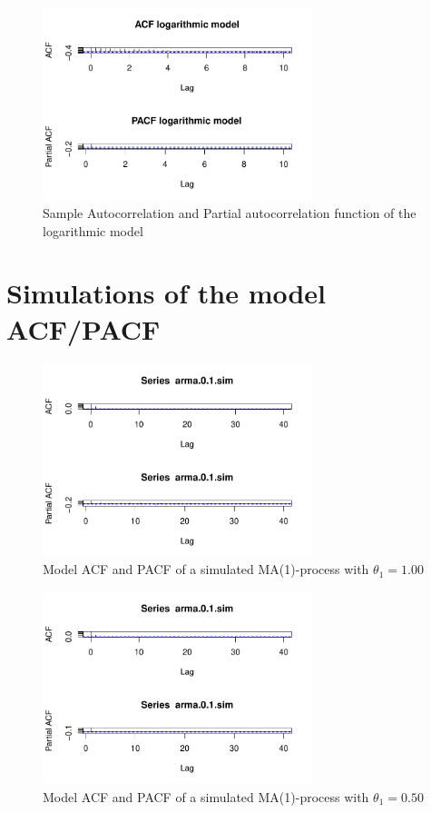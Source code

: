 \documentclass[11pt,a4paper]{article}
\begin{document}
\begin{figure} 
\centering
\includegraphics[angle=0,
width=0.7\textwidth]{acf_pacf_logmodel}
\caption{Sample Autocorrelation and Partial autocorrelation function of the logarithmic model
\label{fig:acf_pacf_logmodel}}
\end{figure}




\section{Simulations of the model ACF/PACF}
\label{sec:simulations}
\begin{figure} 
    \centering
    \includegraphics[width=0.7\textwidth]{sim_ma_1_00}
    \caption{Model ACF and PACF of a simulated MA(1)-process with $\theta_1 = 1.00$}
    \label{fig:sim_ma_1_00}
\end{figure}

\begin{figure} 
    \centering
    \includegraphics[width=0.7\textwidth]{sim_ma_1_05}
    \caption{Model ACF and PACF of a simulated MA(1)-process with $\theta_1 = 0.50$}
    \label{fig:sim_ma_1_05}
\end{figure}
\end{document}
